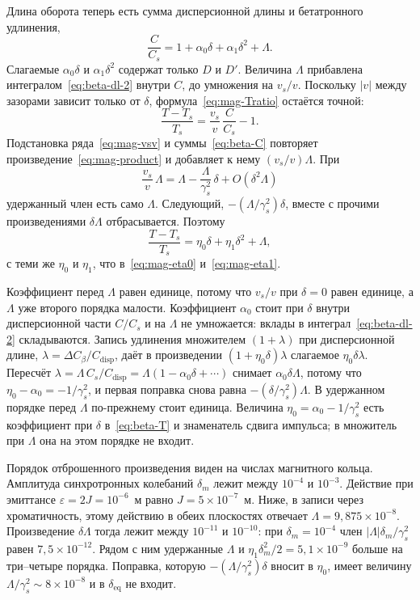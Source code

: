 Длина оборота теперь есть сумма дисперсионной длины и бетатронного удлинения,
\begin{equation}
\label{eq:beta-C}
\frac{C}{C_s}
=1+\alpha_0\delta+\alpha_1\delta^2+\Lambda.
\end{equation}
Слагаемые $\alpha_0\delta$ и $\alpha_1\delta^2$ содержат только $D$ и $D'$. Величина $\Lambda$ прибавлена интегралом~\eqref{eq:beta-dl-2} внутри $C$, до умножения на $v_s/v$. Поскольку $|v|$ между зазорами зависит только от $\delta$, формула~\eqref{eq:mag-Tratio} остаётся точной:
\begin{equation}
\label{eq:beta-Tratio}
\frac{T-T_s}{T_s}
=\frac{v_s}{v}\,\frac{C}{C_s}-1.
\end{equation}
Подстановка ряда~\eqref{eq:mag-vsv} и суммы~\eqref{eq:beta-C} повторяет произведение~\eqref{eq:mag-product} и добавляет к нему $(v_s/v)\Lambda$. При
\begin{equation}
\label{eq:beta-vsv-L}
\frac{v_s}{v}\,\Lambda
=\Lambda-\frac{\Lambda}{\gamma_s^2}\,\delta+O(\delta^2\Lambda)
\end{equation}
удержанный член есть само $\Lambda$. Следующий, $-(\Lambda/\gamma_s^2)\delta$, вместе с прочими произведениями $\delta\Lambda$ отбрасывается. Поэтому
\begin{equation}
\label{eq:beta-T}
\frac{T-T_s}{T_s}
=\eta_0\delta+\eta_1\delta^2+\Lambda,
\end{equation}
с теми же $\eta_0$ и $\eta_1$, что в~\eqref{eq:mag-eta0} и~\eqref{eq:mag-eta1}.

Коэффициент перед $\Lambda$ равен единице, потому что $v_s/v$ при $\delta=0$ равен единице, а $\Lambda$ уже второго порядка малости. Коэффициент $\alpha_0$ стоит при $\delta$ внутри дисперсионной части $C/C_s$ и на $\Lambda$ не умножается: вклады в интеграл~\eqref{eq:beta-dl-2} складываются. Запись удлинения множителем $(1+\lambda)$ при дисперсионной длине, $\lambda=\Delta C_\beta/C_{\mathrm{disp}}$, даёт в произведении $(1+\eta_0\delta)\lambda$ слагаемое $\eta_0\delta\lambda$. Пересчёт $\lambda=\Lambda\,C_s/C_{\mathrm{disp}}=\Lambda(1-\alpha_0\delta+\cdots)$ снимает $\alpha_0\delta\Lambda$, потому что $\eta_0-\alpha_0=-1/\gamma_s^2$, и первая поправка снова равна $-(\delta/\gamma_s^2)\Lambda$. В удержанном порядке перед $\Lambda$ по-прежнему стоит единица. Величина $\eta_0=\alpha_0-1/\gamma_s^2$ есть коэффициент при $\delta$ в~\eqref{eq:beta-T} и знаменатель сдвига импульса; в множитель при $\Lambda$ она на этом порядке не входит.

Порядок отброшенного произведения виден на числах магнитного кольца. Амплитуда синхротронных колебаний $\delta_m$ лежит между $10^{-4}$ и $10^{-3}$. Действие при эмиттансе $\varepsilon=2J=10^{-6}$~м равно $J=5\times 10^{-7}$~м. Ниже, в записи через хроматичность, этому действию в обеих плоскостях отвечает $\Lambda=9{,}875\times 10^{-8}$. Произведение $\delta\Lambda$ тогда лежит между $10^{-11}$ и $10^{-10}$: при $\delta_m=10^{-4}$ член $|\Lambda|\delta_m/\gamma_s^2$ равен $7{,}5\times 10^{-12}$. Рядом с ним удержанные $\Lambda$ и $\eta_1\delta_m^2/2=5{,}1\times 10^{-9}$ больше на три--четыре порядка. Поправка, которую $-(\Lambda/\gamma_s^2)\delta$ вносит в $\eta_0$, имеет величину $\Lambda/\gamma_s^2\sim 8\times 10^{-8}$ и в $\delta_{\mathrm{eq}}$ не входит.

